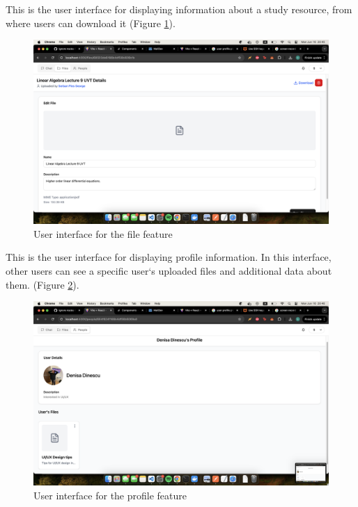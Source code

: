 This is the user interface for displaying information about a study resource, from where users can download it (Figure \ref{fig:file-feature}).

\begin{figure}[H]
    \centering
    \includegraphics[width=1\linewidth]{screenshots/file-feature.png}
    \caption{User interface for the file feature}
    \label{fig:file-feature}
\end{figure}

This is the user interface for displaying profile information. In this interface, other users can see a specific user`s uploaded files and additional data about them. (Figure \ref{fig:profile-feature}).

\begin{figure}[H]
    \centering
    \includegraphics[width=1\linewidth]{screenshots/profile-feature.png}
    \caption{User interface for the profile feature}
    \label{fig:profile-feature}
\end{figure}

